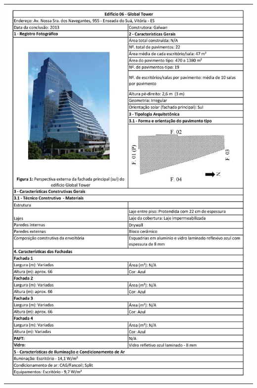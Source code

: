 \begin{table}[H]
    \centering
    \begin{tabular}{l}
        \includegraphics[width=\textwidth]{figures/appendices/edificio06.jpg}
    \end{tabular}
\end{table}
\pagebreak
